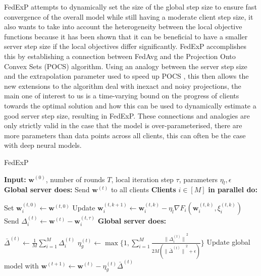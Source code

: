 \documentclass{article}
\newlength\myindent
\newcommand\bindent{%
  \begingroup
  \setlength{\itemindent}{\myindent}
  \addtolength{\algorithmicindent}{\myindent}
}
\newcommand\eindent{\endgroup}
\begin{document}
FedExP attempts to dynamically set the size of the global step size to ensure fast convergence of the overall model while still having a moderate client step size, it also wants to take into account the heterogeneity between the local objective functions because it has been shown that it can be beneficial to have a smaller server step size if the local objectives differ significantly. \cite{}  FedExP accomplishes this by establishing a connection between FedAvg and the Projection Onto Convex Sets (POCS) algorithm.  Using an analogy between the server step size and the extrapolation parameter used to speed up POCS \cite{}, this then allows the new extensions to the algorithm deal with inexact and noisy projections, the main one of interest to us is a time-varying bound on the progress of clients towards the optimal solution and how this can be used to dynamically estimate a good server step size, resulting in FedExP.  These connections and analogies are only strictly valid in the case that the model is over-parameterised, there are more parameters than data points across all clients, this can often be the case with deep neural models.

\begin{algorithm}
\caption{FedExP}
\begin{algorithmic} 
\STATE \textbf{Input:} $\textbf{w}^{(0)}$, number of rounds $T$, local iteration step $\tau$, parameters $\eta_l, \epsilon$\\
    \STATE \textbf{Global server does:}
    \STATE Send $\textbf{w}^{(t)}$ to all clients
    \STATE \textbf{Clients} $i \in [M]$ \textbf{in parallel do:}
    \bindent
    \STATE Set $\textbf{w}_i^{(t,0)} \leftarrow \textbf{w}^{(t,0)}$    
            \STATE Update $\textbf{w}_i^{(t,k+1)} \leftarrow \textbf{w}_i^{(t,k)} - \eta_l \nabla F_i (\textbf{w}_i^{(t,k)}, \xi_i^{(t,k)})$
        \ENDFOR
        \STATE Send $\Delta_i^{(t)} \leftarrow \textbf{w}^{(t)} - \textbf{w}_i^{(t,\tau)}$
    \eindent
    \STATE \textbf{Global server does:}
    \bindent
    \STATE $\bar{\Delta}^{(t)} \leftarrow \frac{1}{M} \sum_{i=1}^{M}{\Delta_i^{(t)}}$
    \STATE $\eta_g^{(t)} \leftarrow \max\{1, \sum_{i=1}^{M}{\frac{{\lVert\Delta_i^{(t)}\rVert}^2}{2M({\lVert\bar{\Delta}^{(t)}\rVert}^{2} + \epsilon)}}\}$
    \STATE Update global model with $\textbf{w}^{(t+1)} \leftarrow \textbf{w}^{(t)} - \eta_g^{(t)}\bar{\Delta}^{(t)}$
    \eindent
\ENDFOR
\end{algorithmic}

\end{algorithm}
\end{document}
